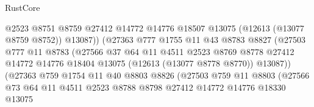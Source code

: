 \begin{lexlean}{RustCore}
\begin{coremodule}
                                    @2523
                                    @8751
                                    @8759
                                    @27412
                                    @14772
                                    @14776
                                    @18507
                                    @13075
                                    (@12613 (@13077 @8759 @8752))
                                    @13087))
                                (@27363
                                  @777
                                  @1755
                                  @11
                                  @43
                                  @8783
                                  @8827
                                  (@27503
                                    @777
                                    @11
                                    @8783
                                    (@27566
                                      @37
                                      @64
                                      @11
                                      @4511
                                      @2523
                                      @8769
                                      @8778
                                      @27412
                                      @14772
                                      @14776
                                      @18404
                                      @13075
                                      (@12613 (@13077 @8778 @8770))
                                      @13087))
                                  (@27363
                                    @759
                                    @1754
                                    @11
                                    @40
                                    @8803
                                    @8826
                                    (@27503
                                      @759
                                      @11
                                      @8803
                                      (@27566
                                        @73
                                        @64
                                        @11
                                        @4511
                                        @2523
                                        @8788
                                        @8798
                                        @27412
                                        @14772
                                        @14776
                                        @18330
                                        @13075

\end{coremodule}
\end{lexlean}

